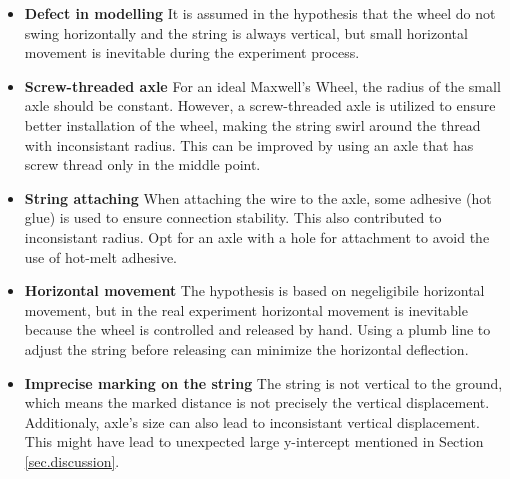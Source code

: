 \documentclass[a4paper]{article}
\begin{document}
\begin{itemize}
    \item \textbf{Defect in modelling} It is assumed in the hypothesis that the wheel do not swing horizontally and the string is always vertical, but small horizontal movement is inevitable during the experiment process.
    \item \textbf{Screw-threaded axle} For an ideal Maxwell's Wheel, the radius of the small axle should be constant. However, a screw-threaded axle is utilized to ensure better installation of the wheel, making the string swirl around the thread with inconsistant radius. This can be improved by using an axle that has screw thread only in the middle point. 
    \item \textbf{String attaching} When attaching the wire to the axle, some adhesive (hot glue) is used to ensure connection stability. This also contributed to inconsistant radius. Opt for an axle with a hole for attachment to avoid the use of hot-melt adhesive. 
    \item \textbf{Horizontal movement} The hypothesis is based on negeligibile horizontal movement, but in the real experiment horizontal movement is inevitable because the wheel is controlled and released by hand. Using a plumb line to adjust the string before releasing can minimize the horizontal deflection.
    \item \textbf{Imprecise marking on the string} The string is not vertical to the ground, which means the marked distance is not precisely the vertical displacement. Additionaly, axle's size can also lead to inconsistant vertical displacement. This might have lead to unexpected large y-intercept mentioned in Section \ref{sec.discussion}.
\end{itemize}



\end{document}
